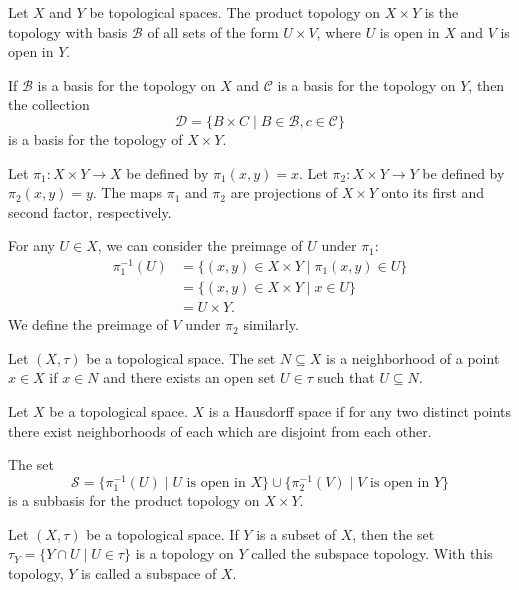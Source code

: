 \documentclass{article}
\newcommand{\inv}{^{-1}}
\newcommand{\B}{\mathcal B}
\begin{document}
\medskip{}

    Let $X$ and $Y$ be topological spaces. The product topology on $X \times Y$ is the topology with basis $\B$ of all sets of the form $U \times V$, where $U$ is open in $X$ and $V$ is open in $Y$.

\medskip{}

    If $\B$ is a basis for the topology on $X$ and $\mathcal C$ is a basis for the topology on $Y$, then the collection $$\mathcal D = \{B \times C \mid B \in \B, c \in \mathcal C\}$$ is a basis for the topology of $X \times Y$.

\medskip{}

    Let $\pi_1: X \times Y \to X$ be defined by $\pi_1(x,y) = x$.
    Let $\pi_2: X \times Y \to Y$ be defined by $\pi_2(x,y) = y$.
    The maps $\pi_1$ and $\pi_2$ are projections of $X \times Y$ onto its first and second factor, respectively.

    For any $U \in X$, we can consider the preimage of $U$ under $\pi_1$:
    \begin{align*}
        \pi_1\inv(U) &= \{(x,y) \in X \times Y \mid \pi_1(x,y) \in U\} \\
                     &= \{(x,y) \in X \times Y \mid x \in U\} \\
                     &= U \times Y.
    \end{align*}
    We define the preimage of $V$ under $\pi_2$ similarly.

\medskip{}

    Let $(X, \tau)$ be a topological space.
    The set $N \subseteq X$ is a neighborhood of a point $x \in X$ if $x \in N$ and there exists an open set $U \in \tau$ such that $U \subseteq N$.

\medskip{}

    Let $X$ be a topological space. $X$ is a Hausdorff space if for any two distinct points there exist neighborhoods of each which are disjoint from each other.

\medskip{}

    The set $$\mathcal S = \{\pi_1\inv(U) \mid U \text{ is open in } X\} \cup \{\pi_2\inv(V) \mid V \text{ is open in } Y\}$$ is a subbasis for the product topology on $X \times Y$.

\medskip{}

    Let $(X,\tau)$ be a topological space. If $Y$ is a subset of $X$, then the set $\tau_Y = \{Y \cap U \mid U \in \tau\}$ is a topology on $Y$ called the subspace topology. With this topology, $Y$ is called a subspace of $X$.
\end{document}
